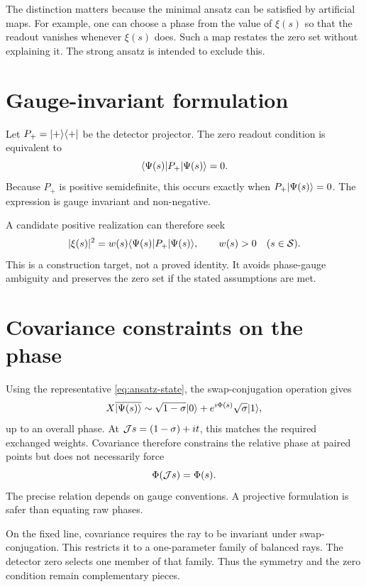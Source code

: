 The distinction matters because the minimal ansatz can be satisfied by artificial maps. For example, one can choose a phase from the value of $\xi(s)$ so that the readout vanishes whenever $\xi(s)$ does. Such a map restates the zero set without explaining it. The strong ansatz is intended to exclude this.

\section{Gauge-invariant formulation}

Let $P_+=\lvert +\rangle\langle +\rvert$ be the detector projector. The zero readout condition is equivalent to
\begin{equation}
 \langle \Psi(s)\rvert P_+\lvert \Psi(s)\rangle=0.
 \label{eq:projector-zero}
\end{equation}
Because $P_+$ is positive semidefinite, this occurs exactly when $P_+\lvert \Psi(s)\rangle=0$. The expression is gauge invariant and non-negative.

A candidate positive realization can therefore seek
\begin{equation}
 |\xi(s)|^2=w(s)\langle \Psi(s)\rvert P_+\lvert \Psi(s)\rangle,
 \qquad w(s)>0\quad(s\in\mathcal{S}).
 \label{eq:positive-factorization}
\end{equation}
This is a construction target, not a proved identity. It avoids phase-gauge ambiguity and preserves the zero set if the stated assumptions are met.

\section{Covariance constraints on the phase}

Using the representative \cref{eq:ansatz-state}, the swap-conjugation operation gives
\[
 X\overline{\lvert \Psi(s)\rangle}
 \sim \sqrt{1-\sigma}\lvert 0\rangle+e^{i\Phi(s)}\sqrt\sigma\lvert 1\rangle,
\]
up to an overall phase. At $\mathcal{J} s=(1-\sigma)+it$, this matches the required exchanged weights. Covariance therefore constrains the relative phase at paired points but does not necessarily force
\[
 \Phi(\mathcal{J} s)=\Phi(s).
\]
The precise relation depends on gauge conventions. A projective formulation is safer than equating raw phases.

On the fixed line, covariance requires the ray to be invariant under swap-conjugation. This restricts it to a one-parameter family of balanced rays. The detector zero selects one member of that family. Thus the symmetry and the zero condition remain complementary pieces.

